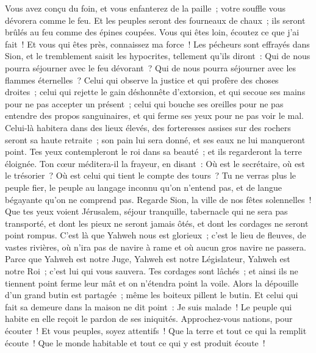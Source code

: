 \begin{multicols}{2}
Vous avez conçu du foin, et vous enfanterez de la paille~; votre souffle vous dévorera comme le feu.
Et les peuples seront des fourneaux de chaux~; ils seront brûlés au feu comme des épines coupées.
Vous qui êtes loin, écoutez ce que j'ai fait~! Et vous qui êtes près, connaissez ma force~!
Les pécheurs sont effrayés dans Sion, et le tremblement saisit les hypocrites, tellement qu'ils diront~: Qui de nous pourra séjourner avec le feu dévorant~? Qui de nous pourra séjourner avec les flammes éternelles~?
Celui qui observe la justice et qui profère des choses droites~; celui qui rejette le gain déshonnête d'extorsion, et qui secoue ses mains pour ne pas accepter un présent~; celui qui bouche ses oreilles pour ne pas entendre des propos sanguinaires, et qui ferme ses yeux pour ne pas voir le mal.
Celui-là habitera dans des lieux élevés, des forteresses assises sur des rochers seront sa haute retraite~; son pain lui sera donné, et ses eaux ne lui manqueront point.
Tes yeux contempleront le roi dans sa beauté~; et ils regarderont la terre éloignée.
Ton cœur méditera-il la frayeur, en disant~: Où est le secrétaire, où est le trésorier~? Où est celui qui tient le compte des tours~?
Tu ne verras plus le peuple fier, le peuple au langage inconnu qu'on n'entend pas, et de langue bégayante qu'on ne comprend pas.
Regarde Sion, la ville de nos fêtes solennelles~! Que tes yeux voient Jérusalem, séjour tranquille, tabernacle qui ne sera pas transporté, et dont les pieux ne seront jamais ôtés, et dont les cordages ne seront point rompus.
C'est là que Yahweh nous est glorieux~; c'est le lieu de fleuves, de vastes rivières, où n'ira pas de navire à rame et où aucun gros navire ne passera.
Parce que Yahweh est notre Juge, Yahweh est notre Législateur, Yahweh est notre Roi~; c'est lui qui vous sauvera.
Tes cordages sont lâchés~; et ainsi ils ne tiennent point ferme leur mât et on n'étendra point la voile. Alors la dépouille d'un grand butin est partagée~; même les boiteux pillent le butin.
Et celui qui fait sa demeure dans la maison ne dit point~: Je suis malade~! Le peuple qui habite en elle reçoit le pardon de ses iniquités.
\VerseOne{}Approchez-vous nations, pour écouter~! Et vous peuples, soyez attentifs~! Que la terre et tout ce qui la remplit écoute~! Que le monde habitable et tout ce qui y est produit écoute~!

\end{multicols}
